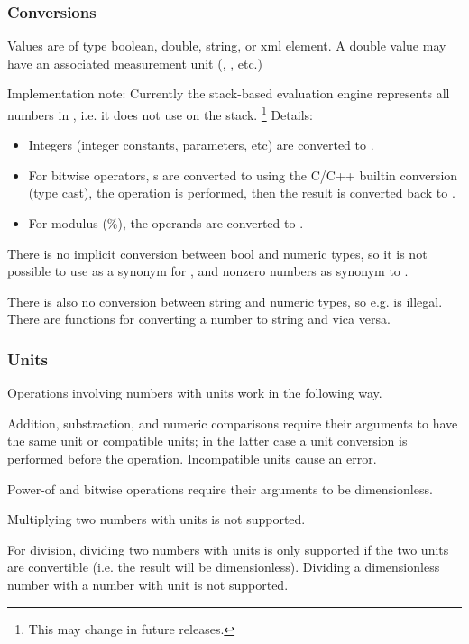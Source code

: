\subsubsection{Conversions}

Values are of type boolean, double, string, or xml element. A double value
may have an associated measurement unit (, , etc.)

Implementation note: Currently the stack-based evaluation engine
represents all numbers in , i.e. it does not use 
on the stack.
    \footnote{This may change in future releases.}
Details:

\begin{itemize}
  \item Integers (integer constants,  parameters, etc) are
        converted to .
  \item For bitwise operators, s are converted to 
        using the C/C++ builtin conversion (type cast), the operation is performed,
        then the result is converted back to .
  \item For modulus (\%), the operands are converted to .
\end{itemize}

There is no implicit conversion between bool and numeric types, so it is
not possible to use  as a synonym for , and nonzero numbers
as synonym to .

There is also no conversion between string and numeric types, so e.g. 
is illegal. There are functions for converting a number to string and vica versa.

\subsubsection{Units}

Operations involving numbers with units work in the following way.

Addition, substraction, and numeric comparisons require their arguments to
have the same unit or compatible units; in the latter case a unit conversion
is performed before the operation. Incompatible units cause an error.

Power-of and bitwise operations require their arguments to be dimensionless.

Multiplying two numbers with units is not supported.

For division, dividing two numbers with units is only supported if the two
units are convertible (i.e. the result will be dimensionless). Dividing
a dimensionless number with a number with unit is not supported.


